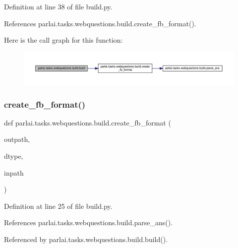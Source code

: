 Definition at line 38 of file build.\+py.



References parlai.\+tasks.\+webquestions.\+build.\+create\+\_\+fb\+\_\+format().

Here is the call graph for this function\+:
\nopagebreak
\begin{figure}[H]
\begin{center}
\leavevmode
\includegraphics[width=350pt]{namespaceparlai_1_1tasks_1_1webquestions_1_1build_a175826dcfcbe18189c4c668b1b335239_cgraph}
\end{center}
\end{figure}
\mbox{\label{namespaceparlai_1_1tasks_1_1webquestions_1_1build_aba751402cc3a79acbe7517832498a7e6}} 
\subsubsection{\texorpdfstring{create\+\_\+fb\+\_\+format()}{create\_fb\_format()}}
{\footnotesize\ttfamily def parlai.\+tasks.\+webquestions.\+build.\+create\+\_\+fb\+\_\+format (\begin{DoxyParamCaption}\item[{}]{outpath,  }\item[{}]{dtype,  }\item[{}]{inpath }\end{DoxyParamCaption})}



Definition at line 25 of file build.\+py.



References parlai.\+tasks.\+webquestions.\+build.\+parse\+\_\+ans().



Referenced by parlai.\+tasks.\+webquestions.\+build.\+build().

